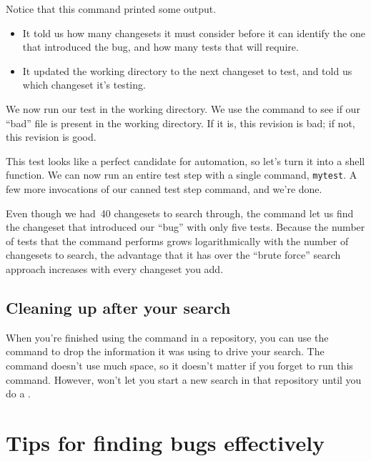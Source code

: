 Notice that this command printed some output.
\begin{itemize}
\item It told us how many changesets it must consider before it can
  identify the one that introduced the bug, and how many tests that
  will require.
\item It updated the working directory to the next changeset to test,
  and told us which changeset it's testing.
\end{itemize}

We now run our test in the working directory.  We use the
 command to see if our ``bad'' file is present in the
working directory.  If it is, this revision is bad; if not, this
revision is good.

This test looks like a perfect candidate for automation, so let's turn
it into a shell function.
We can now run an entire test step with a single command,
\texttt{mytest}.
A few more invocations of our canned test step command, and we're
done.

Even though we had~40 changesets to search through, the 
command let us find the changeset that introduced our ``bug'' with
only five tests.  Because the number of tests that the 
command performs grows logarithmically with the number of changesets to
search, the advantage that it has over the ``brute force'' search
approach increases with every changeset you add.

\subsection{Cleaning up after your search}

When you're finished using the  command in a
repository, you can use the  command to drop
the information it was using to drive your search.  The command
doesn't use much space, so it doesn't matter if you forget to run this
command.  However,  won't let you start a new search in
that repository until you do a .

\section{Tips for finding bugs effectively}

